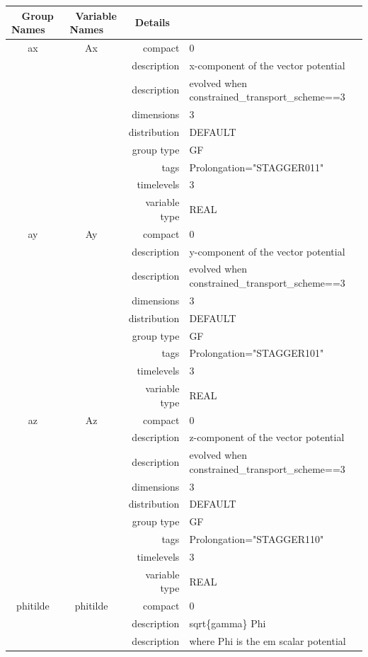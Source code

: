 \begin{tabular*}{150mm}{|c|c@{\extracolsep{\fill}}|rl|} \hline 
~ {\bf Group Names} ~ & ~ {\bf Variable Names} ~  &{\bf Details} ~ & ~ \\ 
\hline 
ax & Ax & compact & 0 \\ 
 &  & description & x-component of the vector potential \\ 
& ~ & description &  evolved when constrained\_transport\_scheme==3 \\ 
 &  & dimensions & 3 \\ 
 &  & distribution & DEFAULT \\ 
 &  & group type & GF \\ 
 &  & tags & Prolongation="STAGGER011" \\ 
 &  & timelevels & 3 \\ 
 &  & variable type & REAL \\ 
\hline 
ay & Ay & compact & 0 \\ 
 &  & description & y-component of the vector potential \\ 
& ~ & description &  evolved when constrained\_transport\_scheme==3 \\ 
 &  & dimensions & 3 \\ 
 &  & distribution & DEFAULT \\ 
 &  & group type & GF \\ 
 &  & tags & Prolongation="STAGGER101" \\ 
 &  & timelevels & 3 \\ 
 &  & variable type & REAL \\ 
\hline 
az & Az & compact & 0 \\ 
 &  & description & z-component of the vector potential \\ 
& ~ & description &  evolved when constrained\_transport\_scheme==3 \\ 
 &  & dimensions & 3 \\ 
 &  & distribution & DEFAULT \\ 
 &  & group type & GF \\ 
 &  & tags & Prolongation="STAGGER110" \\ 
 &  & timelevels & 3 \\ 
 &  & variable type & REAL \\ 
\hline 
phitilde & phitilde & compact & 0 \\ 
 &  & description & sqrt\{gamma\} Phi \\ 
& ~ & description &  where Phi is the em scalar potential \\ 

\end{tabular*}
